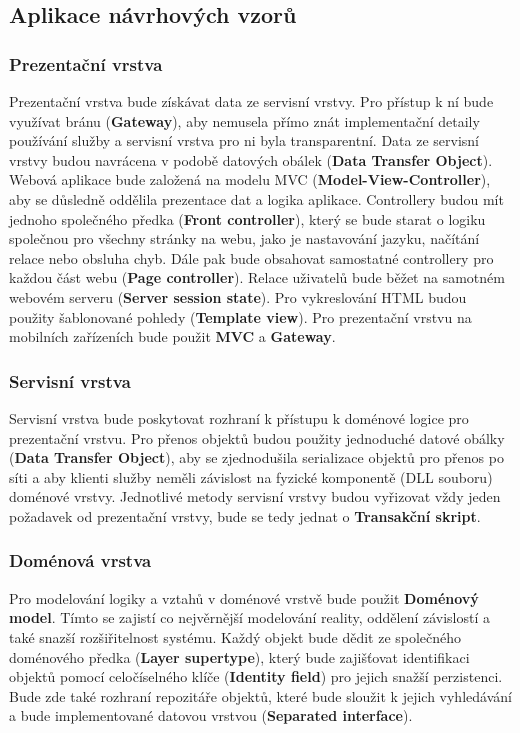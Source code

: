 \documentclass[a4paper,10pt,titlepage]{article}
\begin{document}
			\subsection{Aplikace návrhových vzorů}
				\subsubsection*{Prezentační vrstva}
					Prezentační vrstva bude získávat data ze servisní vrstvy. Pro přístup k ní bude využívat bránu (\textbf{Gateway}), aby
					nemusela přímo znát implementační detaily používání služby a servisní vrstva pro ni byla transparentní.
					Data ze servisní vrstvy budou navrácena v podobě datových obálek (\textbf{Data Transfer Object}).
					Webová aplikace bude založená na modelu MVC (\textbf{Model-View-Controller}), aby se důsledně oddělila prezentace dat a logika aplikace.
					Controllery budou mít jednoho společného předka (\textbf{Front controller}), který se bude starat o logiku společnou pro všechny stránky na
					webu, jako je nastavování jazyku, načítání relace nebo obsluha chyb. Dále pak bude obsahovat samostatné controllery pro každou část webu
					(\textbf{Page controller}). Relace uživatelů bude běžet na samotném webovém serveru (\textbf{Server session state}). Pro vykreslování
					HTML budou použity šablonované pohledy (\textbf{Template view}). Pro prezentační vrstvu na mobilních zařízeních bude použit
					\textbf{MVC} a \textbf{Gateway}.
			
				\subsubsection*{Servisní vrstva}
					Servisní vrstva bude poskytovat rozhraní k přístupu k doménové logice pro prezentační vrstvu.
					Pro přenos objektů budou použity jednoduché datové obálky (\textbf{Data Transfer Object}), aby se zjednodušila serializace
					objektů pro přenos po síti a aby klienti služby neměli závislost na fyzické komponentě (DLL souboru) doménové vrstvy.
					Jednotlivé metody servisní vrstvy budou vyřizovat vždy jeden požadavek od prezentační vrstvy, bude se tedy jednat o \textbf{Transakční skript}.
			
				\subsubsection*{Doménová vrstva}
					Pro modelování logiky a vztahů v doménové vrstvě bude použit \textbf{Doménový model}. Tímto se zajistí co nejvěrnější modelování reality, oddělení
					závislostí a také snazší rozšiřitelnost systému. Každý objekt bude dědit ze společného doménového předka (\textbf{Layer supertype}),
					který bude zajišťovat identifikaci objektů pomocí celočíselného klíče (\textbf{Identity field}) pro jejich snažší perzistenci.
					Bude zde také rozhraní repozitáře objektů, které bude sloužit k jejich vyhledávání a bude implementované datovou vrstvou (\textbf{Separated interface}).
				
\end{document}
